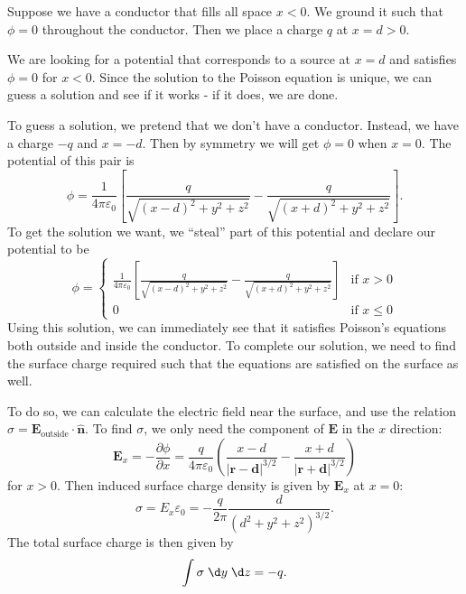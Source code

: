 \documentclass[a4paper]{article}
\begin{document}
\begin{eg}
  Suppose we have a conductor that fills all space $x < 0$. We ground it such that $\phi = 0$ throughout the conductor. Then we place a charge $q$ at $x = d > 0$.
  \begin{center}
  \end{center}
  We are looking for a potential that corresponds to a source at $x = d$ and satisfies $\phi = 0$ for $x < 0$. Since the solution to the Poisson equation is unique, we can guess a solution and see if it works - if it does, we are done.

  To guess a solution, we pretend that we don't have a conductor. Instead, we have a charge $-q$ and $x = -d$. Then by symmetry we will get $\phi = 0$ when $x = 0$. The potential of this pair is
  \[
    \phi = \frac{1}{4\pi\varepsilon_0}\left[\frac{q}{\sqrt{(x - d)^2 + y^2 + z^2}} - \frac{q}{\sqrt{(x + d)^2 + y^2 + z^2}}\right].
  \]
  To get the solution we want, we ``steal'' part of this potential and declare our potential to be
  \[
    \phi =
    \begin{cases}
      \frac{1}{4\pi\varepsilon_0}\left[\frac{q}{\sqrt{(x - d)^2 + y^2 + z^2}} - \frac{q}{\sqrt{(x + d)^2 + y^2 + z^2}}\right] & \text{if }x > 0\\
    0  & \text{if }x \leq 0
    \end{cases}
  \]
  Using this solution, we can immediately see that it satisfies Poisson's equations both outside and inside the conductor. To complete our solution, we need to find the surface charge required such that the equations are satisfied on the surface as well.

  To do so, we can calculate the electric field near the surface, and use the relation $\sigma = \mathbf{E}_\text{outside}\cdot \hat{\mathbf{n}}$. To find $\sigma$, we only need the component of $\mathbf{E}$ in the $x$ direction:
  \[
    \mathbf{E}_x = -\frac{\partial \phi}{\partial x} = \frac{q}{4\pi\varepsilon_0}\left(\frac{x - d}{|\mathbf{r} - \mathbf{d}|^{3/2}} - \frac{x + d}{|\mathbf{r} + \mathbf{d}|^{3/2}}\right)
  \]
  for $x > 0$. Then induced surface charge density is given by $\mathbf{E}_x$ at $x = 0$:
  \[
    \sigma = E_x\varepsilon_0 = -\frac{q}{2\pi}\frac{d}{(d^2 + y^2 + z^2)^{3/2}}.
  \]
  The total surface charge is then given by
  \[
    \int \sigma \;\d y\;\d z  = -q.
  \]
\end{eg}
\end{document}
